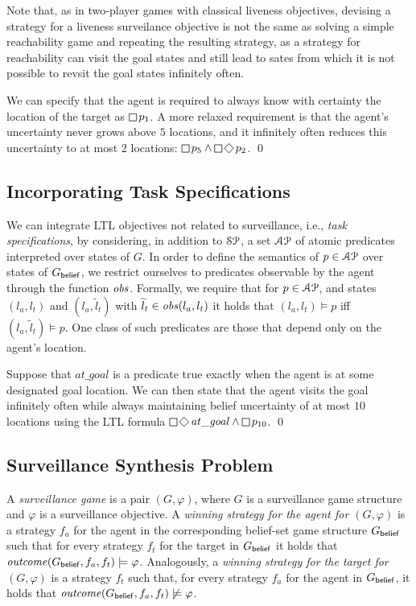 Note that, as in two-player games with classical liveness objectives, devising a strategy for a liveness surveilance objective is not the same as solving a simple reachability game and repeating the resulting strategy, as a strategy for reachability can visit the goal states and still lead to sates from which it is not possible to revsit the goal states infinitely often. 

\bigskip
\begin{eg}
We can specify that the agent is required to always know with certainty the location of the target as
$\LTLglobally p_1$.
A more relaxed requirement is that the agent's uncertainty never grows above $5$ locations, and it infinitely often reduces this uncertainty to at most $2$ locations: $\LTLglobally p_5 \wedge \LTLglobally\LTLfinally p_2$.
\qed
\end{eg}


\subsection{Incorporating Task Specifications}
We can integrate LTL objectives not related to surveillance, i.e., \emph{task specifications}, by considering, in addition to $\mathcal{SP}$, a set $\mathcal{AP}$ of atomic predicates interpreted over states of $G$. In order to define the semantics of $p \in \mathcal{AP}$ over states of $G_{\mathsf{belief}}$, we restrict ourselves to predicates observable by the agent through the function $\mathit{obs}$. 
Formally, we require that for $p \in \mathcal{AP}$, and states $(l_a,l_t)$ and $(l_a,\widetilde l_t)$ with $\widetilde l_t \in \mathit{obs}(l_a,l_t)$ it holds that $(l_a,l_t) \models p$ iff $(l_a,\widetilde l_t) \models p$. One class of such predicates are those that depend only on the agent's location.

\bigskip
\begin{eg}
Suppose that $\mathit{at\_goal}$ is a predicate true exactly when the agent is at some designated goal location. We can then state that the agent visits the goal infinitely often while always maintaining belief uncertainty of at most $10$ locations using the LTL formula $\LTLglobally\LTLfinally \mathit{at\_goal} \wedge \LTLglobally p_{10}$.
\qed
\end{eg}

\subsection{Surveillance Synthesis Problem}
A \emph{surveillance game} is a pair $(G,\varphi)$, where $G$ is a surveillance game structure and $\varphi$ is a surveillance objective. A \emph{winning strategy for the agent for $(G,\varphi)$} is a strategy $f_a$ for the agent in the corresponding belief-set game structure $G_{\mathsf{belief}}$ such that for every strategy $f_t$ for the target in $G_{\mathsf{belief}}$ it holds that $\mathit{outcome}(G_{\mathsf{belief}},f_a,f_t) \models \varphi$. Analogously, a \emph{winning strategy for the target for $(G,\varphi)$} is a strategy $f_t$ such that, for every strategy $f_a$ for the agent in $G_{\mathsf{belief}}$, it holds that $\mathit{outcome}(G_{\mathsf{belief}},f_a,f_t) \not\models \varphi$.

